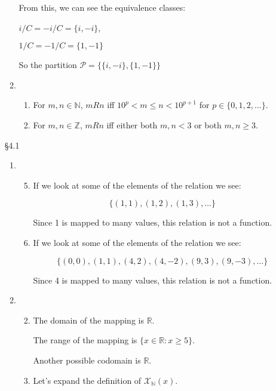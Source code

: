 \documentclass[12pt,letterpaper]{article}
\begin{document}
\begin{enumerate}
\begin{enumerate}
          From this, we can see the equivalence classes:

          $i / C = -i / C = \{i, -i\}$,

          $1 / C = -1 / C = \{1, -1\}$

          So the partition $\mathscr{P} = \{\{i, -i\}, \{1, -1\}\}$
        \setcounter{enumii}{5}
        \item
          \begin{enumerate}
            \item
              For $m, n \in \mathbb{N}$, $m R n$ iff $10^p < m \leq n < 10^{p + 1}$ for $p \in \{0, 1, 2, \dots\}$.
            \setcounter{enumiii}{4}
            \item
              For $m, n \in \mathbb{Z}$, $m R n$ iff either both $m, n < 3$ or both $m, n \geq 3$.
          \end{enumerate}
      \end{enumerate}
    \item [\S 4.1]
      \begin{enumerate}
        \item
          \begin{enumerate}
            \setcounter{enumiii}{4}
            \item
              If we look at some of the elements of the relation we see:

              \[\{(1, 1), (1, 2), (1, 3), \dots\}\]

              Since 1 is mapped to many values, this relation is not a function.
            \item
              If we look at some of the elements of the relation we see:

              \[\{(0, 0), (1, 1), (4, 2), (4, -2), (9, 3), (9, -3), \dots\}\]

              Since 4 is mapped to many values, this relation is not a function.
          \end{enumerate}
        \setcounter{enumii}{2}
        \item
          \begin{enumerate}
            \setcounter{enumiii}{1}
            \item
              The domain of the mapping is $\mathbb{R}$.

              The range of the mapping is $\{x \in \mathbb{R} : x \geq 5\}$.

              Another possible codomain is $\mathbb{R}$.
            \setcounter{enumiii}{4}
            \item
              Let's expand the definition of $\mathcal{X}_\mathbb{N}(x)$.


\end{enumerate}
\end{enumerate}
\end{enumerate}
\end{document}
